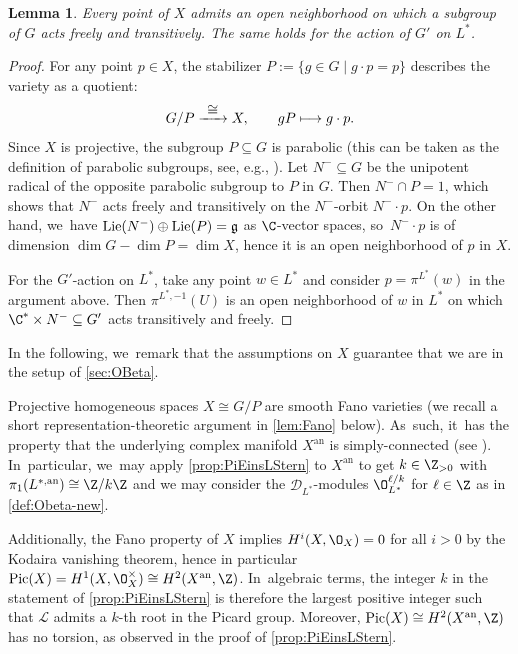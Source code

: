 \documentclass[JEP,XML,SOM,Unicode,published]{cedram}
\newcommand\mto{\mathchoice{\longmapsto}{\mapsto}{\mapsto}{\mapsto}}
\newcommand{\To}[1]{\mathchoice{\xrightarrow{\textstyle\kern4pt#1\kern3pt}}{\xrightarrow{\,#1\,}}{}{}}
\newtheorem{lem}[thm]{Lemma}
\newcommand{\Ell}{\mathscr{L}}
\newcommand{\frg}{\mathfrak{g}}
\DeclareMathOperator{\Lie}{\textup{Lie}}
\DeclareMathOperator{\Pic}{Pic}
\begin{document}
\begin{lem}\label{lem:transitCond}
Every point of $X$ admits an open neighborhood on which a subgroup of $G$ acts freely and transitively. The same holds for the action of $G'$ on $L^*$.
\end{lem}

\begin{proof}
For any point $p \in X$, the stabilizer $P := \{g \in G \mid g \cdot p = p\}$ describes the variety as a quotient:
\[
G/P \To{\cong} X, \qquad gP \mto g \cdot p.
\]
Since $X$ is projective, the subgroup $P \subseteq G$ is parabolic (this can be taken as the definition of parabolic subgroups, see, e.g., \cite[\S21.3]{Hum75}). Let $N^{-} \subseteq G$ be the unipotent radical of the opposite parabolic subgroup to $P$ in $G$. Then $N^{-} \cap P = 1$, which shows that $N^{-}$ acts freely and transitively on the $N^{-}$-orbit $N^{-} \cdot p$. On the other hand, we~have $\Lie(N^{-}) \oplus \Lie(P) = \frg$ as $\C$-vector spaces, so~$N^{-} \cdot p$ is of dimension $\dim G - \dim P = \dim X$, hence it is an open neighborhood of $p$ in $X$.

For the $G'$-action on $L^*$, take any point $w \in L^*$ and consider $p = \pi^{L^*}(w)$ in the argument above. Then $\pi^{L^*,-1}(U)$ is an open neighborhood of $w$ in $L^*$ on which $\C^* \times N^{-} \subseteq G'$ acts transitively and freely.
\end{proof}

In the following, we~remark that the assumptions on $X$ guarantee that we are in the setup of \cref{sec:OBeta}.

\begin{rmk}
Projective homogeneous spaces $X \cong G/P$ are smooth Fano varieties (we recall a short representation-theoretic argument in \cref{lem:Fano} below). As~such, it~has the property that the underlying complex manifold $X^{\mathrm{an}}$ is simply-connected (see \eg \cite[Cor.\,4.29]{Debarre-2001}). In~particular, we~may apply \cref{prop:PiEinsLStern} to $X^{\mathrm{an}}$ to get $k \in \Z_{>0}$ with $\pi_1(L^{*,\mathrm{an}}) \cong \Z/k\Z$ and we may consider the $\mathscr D_{L^*}$\nobreakdash-mod\-ules $\O_{L^*}^{\ell/k}$ for $\ell \in \Z$ as in \cref{def:Obeta-new}.

Additionally, the Fano property of $X$ implies $H^i(X,\O_X) = 0$ for all $i > 0$ by the Kodaira vanishing theorem, hence in particular $\Pic(X) = H^1(X,\O_X^\times) \cong H^2(X^{\mathrm{an}},\Z)$. In~algebraic terms, the integer $k$ in the statement of \cref{prop:PiEinsLStern} is therefore the largest positive integer such that $\Ell$ admits a $k$-th root in the Picard group. Moreover, $\Pic(X) \cong H^2(X^{\mathrm{an}},\Z)$ has no torsion, as observed in the proof of \cref{prop:PiEinsLStern}.
\end{rmk}
\end{document}
